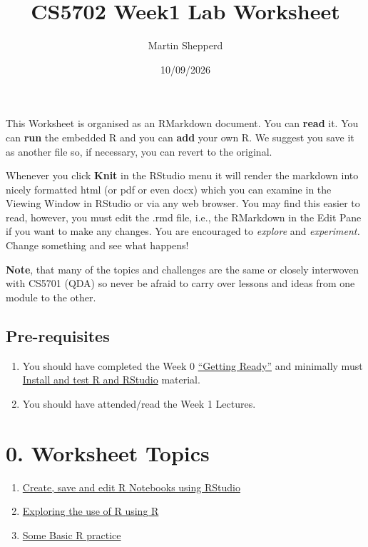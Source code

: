 \documentclass[
]{article}
\title{CS5702 Week1 Lab Worksheet}
\author{Martin Shepperd}
\date{10/09/2026}
\providecommand{\tightlist}{%
  \setlength{\itemsep}{0pt}\setlength{\parskip}{0pt}}
\begin{document}
\maketitle

This Worksheet is organised as an RMarkdown document. You can
\textbf{read} it. You can \textbf{run} the embedded R and you can
\textbf{add} your own R. We suggest you save it as another file so, if
necessary, you can revert to the original.

Whenever you click \textbf{Knit} in the RStudio menu it will render the
markdown into nicely formatted html (or pdf or even docx) which you can
examine in the Viewing Window in RStudio or via any web browser. You may
find this easier to read, however, you must edit the .rmd file, i.e.,
the RMarkdown in the Edit Pane if you want to make any changes. You are
encouraged to \emph{explore} and \emph{experiment.} Change something and
see what happens!

\textbf{Note}, that many of the topics and challenges are the same or
closely interwoven with CS5701 (QDA) so never be afraid to carry over
lessons and ideas from one module to the other.

\subsection{Pre-requisites}\label{pre-requisites}

\begin{enumerate}
\def\labelenumi{\arabic{enumi}.}
\tightlist
\item
  You should have completed the Week 0
  \href{https://martinshepperd-moderndatabook.share.connect.posit.cloud/00-getting-ready.html}{``Getting
  Ready''} and minimally must
  \href{https://martinshepperd-moderndatabook.share.connect.posit.cloud/00-getting-ready.html\#sec-C0_SoftwareInstall}{Install
  and test R and RStudio} material.
\item
  You should have attended/read the Week 1 Lectures.
\end{enumerate}

\section{0. Worksheet Topics}\label{worksheet-topics}

\begin{enumerate}
\def\labelenumi{\arabic{enumi}.}
\tightlist
\item
  \hyperref[WS1]{Create, save and edit R Notebooks using RStudio}
\item
  \hyperref[WS2]{Exploring the use of R using R}
\item
  \hyperref[WS3]{Some Basic R practice}\\
\end{enumerate}
\end{document}
